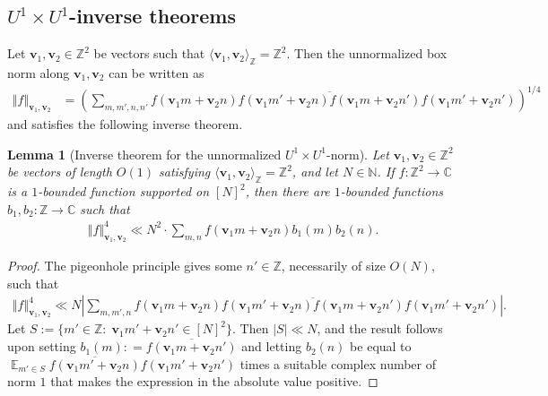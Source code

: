\documentclass[11pt]{amsart}
\newtheorem{lemma}{Lemma}[section]
\theoremstyle{definition}
\DeclareMathOperator*{\E}{\mathbb{E}}
\newcommand{\C}{{\mathbb C}}
\newcommand{\N}{{\mathbb N}}
\newcommand{\Z}{{\mathbb Z}}
\newcommand{\bv}{{\textbf{v}}}
\newcommand{\norm}[1]{\left\Vert #1\right\Vert}
\newcommand{\abs}[1]{\mathopen{}\left| #1\mathclose{}\right|}
\newcommand{\brac}[1]{\mathopen{}\left( #1 \mathclose{}\right)}
\begin{document}
\subsection{$U^1 \times U^1$-inverse theorems}
Let $\bv_1, \bv_2\in\Z^2$ be vectors such that $\langle \bv_1, \bv_2\rangle_{\Z} = \Z^2$. Then the {unnormalized box norm}  along $\bv_1, \bv_2$ can be written as
    \begin{align*}
                \norm{f}_{\bv_1, \bv_2}
                &=\brac{\sum_{m,m',n,n'}f(\bv_1 m + \bv_2 n)\overline{f(\bv_1 m' + \bv_2 n)f(\bv_1 m + \bv_2 n')}f(\bv_1 m' + \bv_2 n')}^{1/4}
    \end{align*}
    and satisfies the following inverse theorem.
\begin{lemma}[Inverse theorem for the unnormalized $U^1\times U^1$-norm]\label{L: unnormalized U1xU1 inverse}
    Let $\bv_1,\bv_2 \in \Z^2$ be vectors of length $O(1)$ satisfying $\langle \bv_1,\bv_2 \rangle_{\Z}=\Z^2$, and let $N \in \N$.  If $f: \Z^2 \to \C$ is a $1$-bounded function supported on $[N]^2$, then there are $1$-bounded functions $b_1, b_2:\Z\to\C$ such that
    \begin{align*}
        \norm{f}_{\bv_1, \bv_2}^4 \ll N^2\cdot \sum_{m,n}f(\bv_1 m + \bv_2 n)b_1(m)b_2(n).
    \end{align*}
\end{lemma}
\begin{proof}
    The pigeonhole principle gives some $n' \in \Z$, necessarily of size $O(N)$, such that
    \begin{align*}
        \norm{f}_{\bv_1, \bv_2}^4 \ll N\abs{\sum_{m,m',n}f(\bv_1 m + \bv_2 n)\overline{f(\bv_1 m' + \bv_2 n)f(\bv_1 m + \bv_2 n')}f(\bv_1 m' + \bv_2 n')}.
    \end{align*}
    Let $S := \{m'\in \Z:\; \bv_1 m' + \bv_2 n'\in[N]^2\}$.
    Then $|S|\ll N$, and the result follows upon setting
    $b_1(m): = \overline{f(\bv_1 m + \bv_2 n')}$ and letting $b_2(n)$ be equal to $\E_{m'\in S} \overline{f(\bv_1 m' + \bv_2 n)}f(\bv_1 m' + \bv_2 n')$ times a suitable complex number of norm $1$ that makes the expression in the absolute value positive.
\end{proof}
\end{document}
